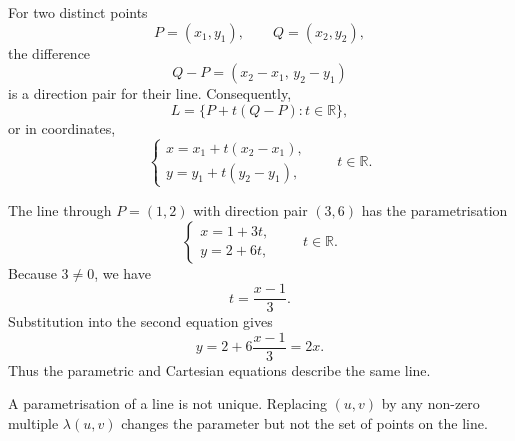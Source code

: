 For two distinct points
\[
P=(x_1,y_1),
\qquad
Q=(x_2,y_2),
\]
the difference
\[
Q-P=(x_2-x_1,\,y_2-y_1)
\]
is a direction pair for their line. Consequently,
\[
L=\{P+t(Q-P):t\in\mathbb{R}\},
\]
or in coordinates,
\[
\begin{cases}
x=x_1+t(x_2-x_1),\\
y=y_1+t(y_2-y_1),
\end{cases}
\qquad t\in\mathbb{R}.
\]

\begin{examplebox}
The line through $P=(1,2)$ with direction pair $(3,6)$ has the parametrisation
\[
\begin{cases}
x=1+3t,\\
y=2+6t,
\end{cases}
\qquad t\in\mathbb{R}.
\]
Because $3\neq0$, we have
\[
t=\frac{x-1}{3}.
\]
Substitution into the second equation gives
\[
y=2+6\frac{x-1}{3}=2x.
\]
Thus the parametric and Cartesian equations describe the same line.
\end{examplebox}

\begin{remarkbox}
A parametrisation of a line is not unique. Replacing $(u,v)$ by any non-zero
multiple $\lambda(u,v)$ changes the parameter but not the set of points on the
line.
\end{remarkbox}
